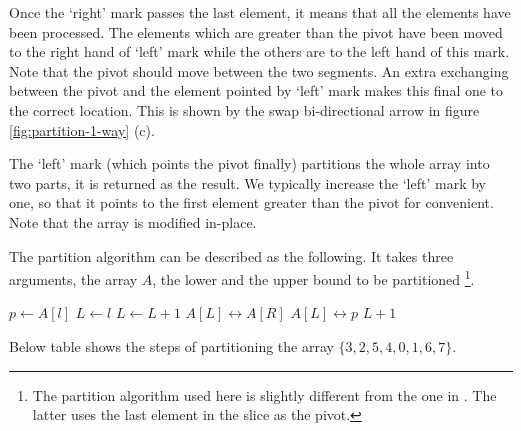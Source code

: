 \documentclass[UTF8]{article}
\begin{document}
Once the `right' mark passes the last element, it means that all the elements have been processed. The elements
which are greater than the pivot have been moved to the right hand of `left' mark while the others are to the
left hand of this mark. Note that the pivot should move between the two segments. An extra exchanging between the pivot and
the element pointed by `left' mark makes this final one to the correct location. This is shown by the swap
bi-directional arrow in figure \ref{fig:partition-1-way} (c).

The `left' mark (which points the pivot finally) partitions the whole array into two parts, it is
returned as the result. We typically increase the `left' mark by one, so that it points to the
first element greater than the pivot for convenient. Note that the array is modified in-place.

The partition algorithm can be described as the following. It takes three arguments, the array $A$, the lower
and the upper bound to be partitioned \footnote{The partition algorithm used here is slightly different from
the one in \cite{CLRS}. The latter uses the last element in the slice as the pivot.}.

\begin{algorithmic}[1]
  \State $p \gets A[l]$  
  \State $L \gets l$ 
   
     
      \State $L \gets L + 1$
      \State {} $A[L] \leftrightarrow A[R]$
    \EndIf
  \EndFor
  \State {} $A[L] \leftrightarrow p$
  \State \Return $L + 1$ 
\EndFunction
\end{algorithmic}

Below table shows the steps of partitioning the array $\{ 3, 2, 5, 4, 0, 1, 6, 7\}$.
\end{document}
